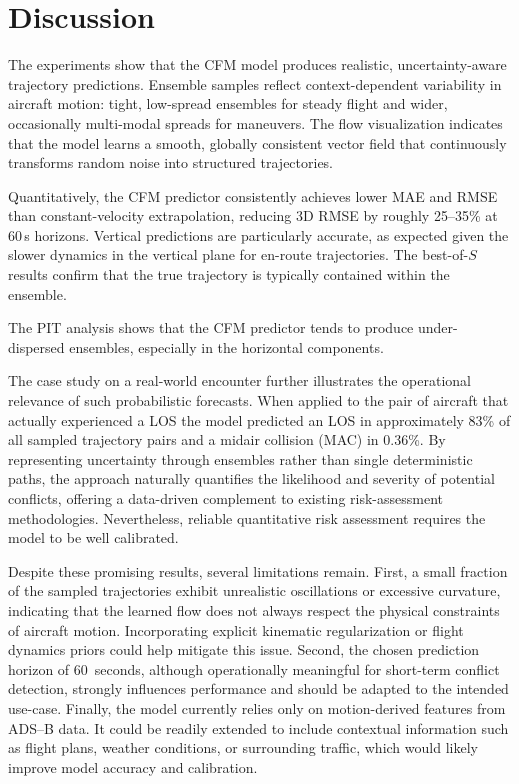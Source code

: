 \documentclass[
  manuscript=proceedings,  %
  layout=preprint,  %
  year=20xx,
  volume=x,
]{extra/joas}
\begin{document}
\section{Discussion}

The experiments show that the CFM model produces realistic, uncertainty-aware trajectory predictions.
Ensemble samples reflect context-dependent variability in aircraft motion: tight, low-spread ensembles for steady flight and wider, occasionally multi-modal spreads for maneuvers.
The flow visualization indicates that the model learns a smooth, globally consistent vector field that continuously transforms random noise into structured trajectories.

Quantitatively, the CFM predictor consistently achieves lower MAE and RMSE than constant-velocity extrapolation, reducing 3D RMSE by roughly 25–35\% at 60\,s horizons.
Vertical predictions are particularly accurate, as expected given the slower dynamics in the vertical plane for en-route trajectories. The best-of-$S$ results confirm that the true trajectory is typically contained within the ensemble.

The PIT analysis shows that the CFM predictor tends to produce under-dispersed ensembles, especially in the horizontal components. 

The case study on a real-world encounter further illustrates the operational relevance of such probabilistic forecasts. 
When applied to the pair of aircraft that actually experienced a LOS the model predicted an LOS in approximately 83\% of all sampled trajectory pairs and a midair collision (MAC) in 0.36\%. 
By representing uncertainty through ensembles rather than single deterministic paths, the approach naturally quantifies the likelihood and severity of potential conflicts, offering a data-driven complement to existing risk-assessment methodologies. Nevertheless, reliable quantitative risk assessment requires the model to be well calibrated.

Despite these promising results, several limitations remain. 
First, a small fraction of the sampled trajectories exhibit unrealistic oscillations or excessive curvature, indicating that the learned flow does not always respect the physical constraints of aircraft motion. 
Incorporating explicit kinematic regularization or flight dynamics priors could help mitigate this issue. 
Second, the chosen prediction horizon of 60~seconds, although operationally meaningful for short-term conflict detection, strongly influences performance and should be adapted to the intended use-case.
Finally, the model currently relies only on motion-derived features from ADS--B data. 
It could be readily extended to include contextual information such as flight plans, weather conditions, or surrounding traffic, which would likely improve model accuracy and calibration.
\end{document}
